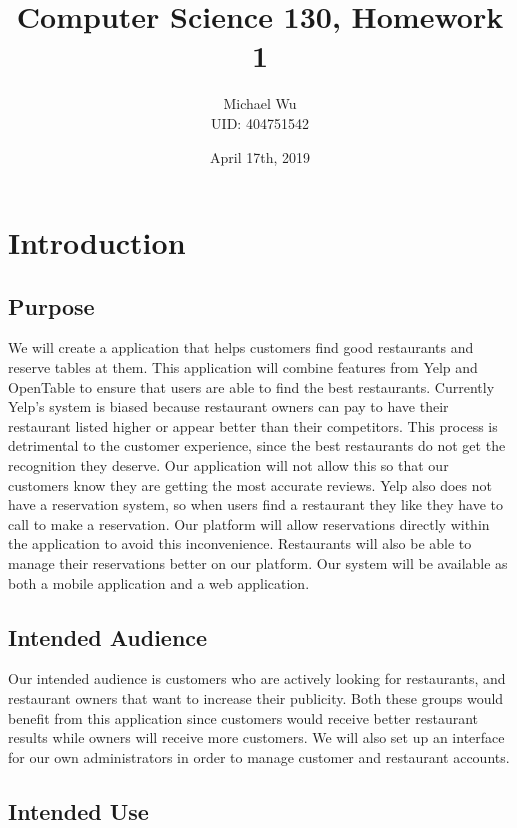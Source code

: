 \documentclass[12pt]{article}
\begin{document}
\title{Computer Science 130, Homework 1}
\date{April 17th, 2019}
\author{Michael Wu\\UID: 404751542}
\maketitle

\section{Introduction}

\subsection{Purpose}

We will create a application that helps customers find good restaurants and reserve tables at them.
This application will combine features from Yelp and OpenTable to ensure that users are able to find the best
restaurants. Currently Yelp's system is biased because restaurant owners can pay to have their restaurant listed
higher or appear better than their competitors. This process is detrimental to the customer experience, since the
best restaurants do not get the recognition they deserve. Our application will not allow this so that our customers
know they are getting the most accurate reviews. Yelp also does not have a reservation system, so when users find
a restaurant they like they have to call to make a reservation. Our platform will allow reservations
directly within the application to avoid this inconvenience. Restaurants will also be able to manage their reservations better
on our platform. Our system will be available as both a mobile application and a web application.

\subsection{Intended Audience}

Our intended audience is customers who are actively looking for restaurants, and restaurant owners that want to
increase their publicity. Both these groups would benefit from this application since customers would receive better
restaurant results while owners will receive more customers. We will also set up an interface for our own administrators
in order to manage customer and restaurant accounts.

\subsection{Intended Use}
\end{document}
